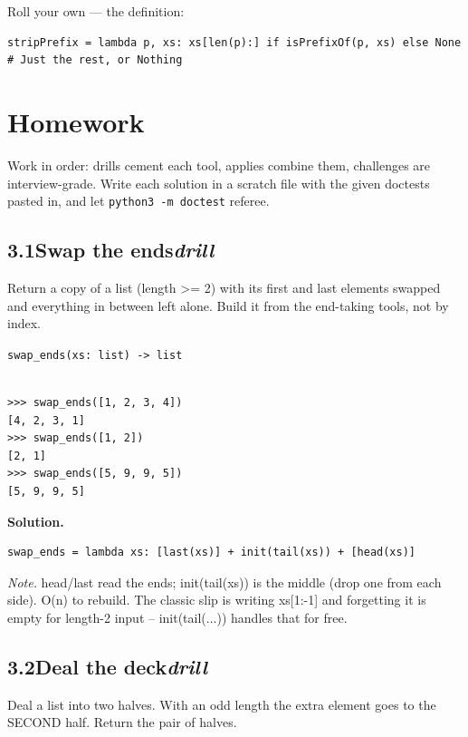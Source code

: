\documentclass[10pt,letterpaper]{book}
\begin{document}
Roll your own --- the definition:

\begin{lstlisting}[style=ex]
stripPrefix = lambda p, xs: xs[len(p):] if isPrefixOf(p, xs) else None  # Just the rest, or Nothing
\end{lstlisting}

\section{Homework}
Work in order: drills cement each tool, applies combine them,
challenges are interview-grade. Write each solution in a scratch file with
the given doctests pasted in, and let \texttt{python3 -m doctest} referee.
\subsection*{3.1\quad Swap the ends\hfill\textnormal{\textit{drill}}}
Return a copy of a list (length >= 2) with its first and last elements swapped and everything in between left alone. Build it from the end-taking tools, not by index.

\noindent\texttt{swap\_ends(xs: list) -> list}
\begin{lstlisting}[style=ex]

>>> swap_ends([1, 2, 3, 4])
[4, 2, 3, 1]
>>> swap_ends([1, 2])
[2, 1]
>>> swap_ends([5, 9, 9, 5])
[5, 9, 9, 5]

\end{lstlisting}
\noindent\textbf{Solution.}
\begin{lstlisting}[style=code]
swap_ends = lambda xs: [last(xs)] + init(tail(xs)) + [head(xs)]
\end{lstlisting}
\noindent\textit{Note.} head/last read the ends; init(tail(xs)) is the middle (drop one from each side). O(n) to rebuild. The classic slip is writing xs[1:-1] and forgetting it is empty for length-2 input -- init(tail(...)) handles that for free.

\subsection*{3.2\quad Deal the deck\hfill\textnormal{\textit{drill}}}
Deal a list into two halves. With an odd length the extra element goes to the SECOND half. Return the pair of halves.
\end{document}

